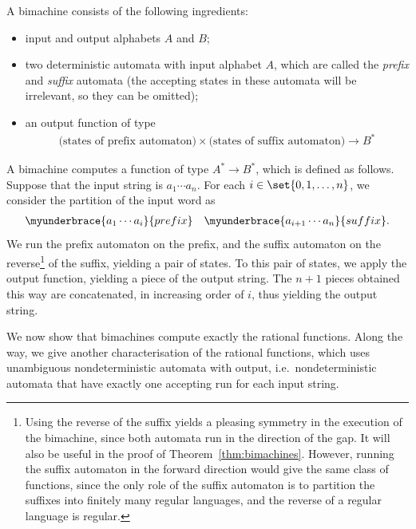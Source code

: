 \begin{definition}
    [Bimachine]
    \label{def:bimachine} A bimachine consists of the following ingredients:
    \begin{itemize}
        \item input and output alphabets $A$ and $B$;
        \item two deterministic automata with input alphabet $A$, which are called the \emph{prefix} and \emph{suffix} automata (the accepting states in these automata will be irrelevant, so they can be omitted);
        \item an output function of type 
        \begin{align*}
        \text{(states of prefix automaton)} 
        \times
        \text{(states of suffix automaton)}
        \to B^*
        \end{align*}
    \end{itemize}
\end{definition}

A bimachine computes a function of type $A^* \to B^*$, which is defined as follows. Suppose that the input string is $a_1 \cdots a_n$. For each $i \in \set{0,1,\ldots,n}$, we consider the partition of the input word as
\begin{align*}
\myunderbrace{a_1 \cdots a_{i}}{prefix}
\quad 
\myunderbrace{a_{i+1} \cdots a_n}{suffix}.
\end{align*}
We run the prefix automaton on the prefix, and the suffix automaton on the reverse\footnote{
    Using the reverse of the suffix yields a pleasing symmetry in the execution of the bimachine, since both automata run in the direction of the gap. It  will also  be useful in the proof of Theorem~\ref{thm:bimachines}. However, running the suffix automaton in the forward direction would give the same class of functions, since the only role of the suffix automaton is to partition the suffixes into finitely many regular languages, and the reverse of a regular language is regular.
} of the  suffix, yielding a pair of states. To this pair of states, we apply the output function, yielding a piece of the output string. The $n+1$ pieces obtained this way are concatenated, in increasing order of $i$, thus  yielding  the output string.

We now show that bimachines compute exactly the rational functions. Along the way, we give another characterisation of the rational functions, which uses unambiguous nondeterministic automata with output, i.e.~nondeterministic automata that have exactly one accepting run for each input string.


